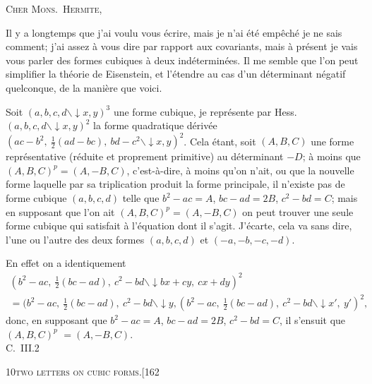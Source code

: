 \documentclass[11pt]{article}
\begin{document}
\bigskip

\noindent\textsc{Cher Mons.\ Hermite,}

Il y a longtemps que j'ai voulu vous \'ecrire, mais je n'ai \'et\'e emp\^ech\'e je ne
sais comment; j'ai assez \`a vous dire par rapport aux covariants, mais \`a pr\'esent je
vais vous parler des formes cubiques \`a deux ind\'etermin\'ees. Il me semble que l'on
peut simplifier la th\'eorie de Eisenstein, et l'\'etendre au cas d'un d\'eterminant n\'egatif
quelconque, de la mani\`ere que voici.

Soit $(a, b, c, d \mathbin{\backslash\!\!\!\downarrow} x, y)^{3}$ une forme cubique, je repr\'esente par Hess.\ $(a, b, c, d \mathbin{\backslash\!\!\!\downarrow} x, y)^{2}$
la forme quadratique d\'eriv\'ee $(ac-b^{2},\ \tfrac{1}{2}(ad-bc),\ bd-c^{2}\mathbin{\backslash\!\!\!\downarrow} x, y)^{2}$. Cela \'etant, soit $(A, B, C)$
une forme repr\'esentative (r\'eduite et proprement primitive) au d\'eterminant $-D$; \`a
moins que $(A, B, C)^{p} = (A, -B, C)$, c'est-\`a-dire, \`a moins qu'on n'ait, ou que la nouvelle
forme laquelle par sa triplication produit la forme principale, il n'existe pas de forme
cubique $(a, b, c, d)$ telle que $b^{2} - ac = A$, $bc - ad = 2B$, $c^{2} - bd = C$; mais en supposant
que l'on ait $(A, B, C)^{p} = (A, -B, C)$ on peut trouver une seule forme cubique qui satisfait \`a
l'\'equation dont il s'agit. J'\'ecarte, cela va sans dire, l'une ou l'autre des deux formes
$(a, b, c, d)$ et $(-a, -b, -c, -d)$.

En effet on a identiquement
\begin{multline*}
(b^{2} - ac,\ \tfrac{1}{2}(bc - ad),\ c^{2} - bd \mathbin{\backslash\!\!\!\downarrow} bx + cy,\ cx + dy)^{2}\\
= (b^{2} - ac,\ \tfrac{1}{2}(bc - ad),\ c^{2} - bd \mathbin{\backslash\!\!\!\downarrow} y, (b^{2} - ac,\ \tfrac{1}{2}(bc - ad),\ c^{2} - bd \mathbin{\backslash\!\!\!\downarrow} x',\ y')^{2},
\end{multline*}
donc, en supposant que $b^{2} - ac = A$, $bc - ad = 2B$, $c^{2} - bd = C$, il s'ensuit que $(A, B, C)^{p}$
$=(A, -B, C)$.\\
\hbox{}\hfill C.\ III.\hfill 2

\newpage

\begin{center}
\small\textsc{10}\hfill\textsc{two letters on cubic forms.}\hfill[162
\end{center}
\end{document}
